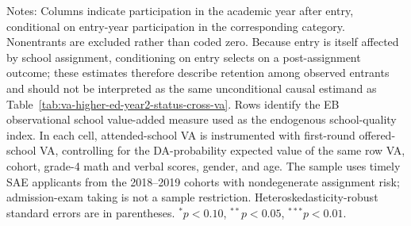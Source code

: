 \begin{table}[!htbp]
\centering
\caption{School value added and retention among entry-year participants}
\label{tab:va-higher-ed-year2-retention-conditional-cross-va}
\begin{threeparttable}
\begin{tablenotes}[flushleft]
\footnotesize
\item Notes: Columns indicate participation in the academic year after entry, conditional on entry-year participation in the corresponding category. Nonentrants are excluded rather than coded zero. Because entry is itself affected by school assignment, conditioning on entry selects on a post-assignment outcome; these estimates therefore describe retention among observed entrants and should not be interpreted as the same unconditional causal estimand as Table~\ref{tab:va-higher-ed-year2-status-cross-va}. Rows identify the EB observational school value-added measure used as the endogenous school-quality index. In each cell, attended-school VA is instrumented with first-round offered-school VA, controlling for the DA-probability expected value of the same row VA, cohort, grade-4 math and verbal scores, gender, and age. The sample uses timely SAE applicants from the 2018--2019 cohorts with nondegenerate assignment risk; admission-exam taking is not a sample restriction. Heteroskedasticity-robust standard errors are in parentheses. $^{*}p<0.10$, $^{**}p<0.05$, $^{***}p<0.01$.
\end{tablenotes}
\end{threeparttable}
\end{table}
